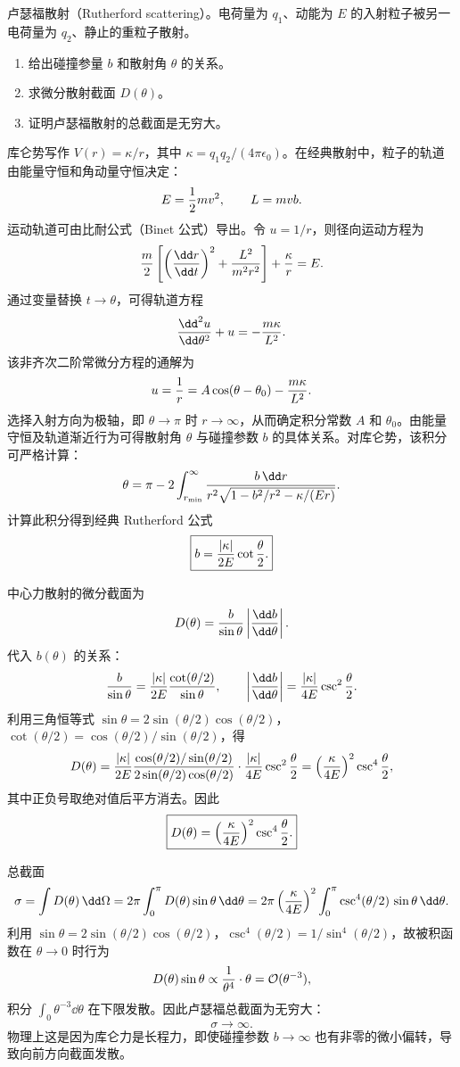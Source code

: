 \begin{question}
卢瑟福散射（Rutherford scattering）。电荷量为 $q_1$、动能为 $E$ 的入射粒子被另一电荷量为 $q_2$、静止的重粒子散射。
\begin{enumerate}
\item 给出碰撞参量 $b$ 和散射角 $\theta$ 的关系。
\item 求微分散射截面 $D(\theta)$。
\item 证明卢瑟福散射的总截面是无穷大。
\end{enumerate}
\end{question}
\begin{solution}
库仑势写作 $V(r)=\kappa/r$，其中 $\kappa=q_1q_2/(4\pi\epsilon_0)$。在经典散射中，粒子的轨道由能量守恒和角动量守恒决定：
\[
E={1\over2}mv^2,\qquad L=mvb.
\]
运动轨道可由比耐公式（Binet 公式）导出。令 $u=1/r$，则径向运动方程为
\[
{m\over2}\left[\left({\dd r\over\dd t}\right)^2+{L^2\over m^2r^2}\right]+{\kappa\over r}=E.
\]
通过变量替换 $t\to\theta$，可得轨道方程
\[
{\dd^2 u\over\dd\theta^2}+u=-{m\kappa\over L^2}.
\]
该非齐次二阶常微分方程的通解为
\[
u={1\over r}=A\cos(\theta-\theta_0)-{m\kappa\over L^2}.
\]
选择入射方向为极轴，即 $\theta\to\pi$ 时 $r\to\infty$，从而确定积分常数 $A$ 和 $\theta_0$。由能量守恒及轨道渐近行为可得散射角 $\theta$ 与碰撞参数 $b$ 的具体关系。对库仑势，该积分可严格计算：
\[
\theta=\pi-2\int_{r_{\min}}^{\infty}{b\,\dd r\over r^2\sqrt{1-b^2/r^2-\kappa/(Er)}}.
\]
计算此积分得到经典 Rutherford 公式
\[
\boxed{b={|\kappa|\over2E}\cot{\theta\over2}.}
\]

中心力散射的微分截面为
\[
D(\theta)={b\over\sin\theta}\left|{\dd b\over\dd\theta}\right|.
\]
代入 $b(\theta)$ 的关系：
\[
{b\over\sin\theta}={|\kappa|\over2E}{\cot(\theta/2)\over\sin\theta},
\qquad
\left|{\dd b\over\dd\theta}\right|={|\kappa|\over4E}\csc^2{\theta\over2}.
\]
利用三角恒等式 $\sin\theta=2\sin(\theta/2)\cos(\theta/2)$，$\cot(\theta/2)=\cos(\theta/2)/\sin(\theta/2)$，得
\[
D(\theta)={|\kappa|\over2E}{\cos(\theta/2)/\sin(\theta/2)\over2\sin(\theta/2)\cos(\theta/2)}\cdot{|\kappa|\over4E}\csc^2{\theta\over2}
=\left({\kappa\over4E}\right)^2\csc^4{\theta\over2},
\]
其中正负号取绝对值后平方消去。因此
\[
\boxed{D(\theta)=\left({\kappa\over4E}\right)^2\csc^4{\theta\over2}.}
\]

总截面
\[
\sigma=\int D(\theta)\,\dd\Omega=2\pi\int_0^\pi D(\theta)\sin\theta\,\dd\theta
=2\pi\left({\kappa\over4E}\right)^2\int_0^\pi{\csc^4(\theta/2)\,\sin\theta}\,\dd\theta.
\]
利用 $\sin\theta=2\sin(\theta/2)\cos(\theta/2)$，$\csc^4(\theta/2)=1/\sin^4(\theta/2)$，故被积函数在 $\theta\to0$ 时行为
\[
D(\theta)\sin\theta\propto{1\over\theta^4}\cdot\theta={\cal O}(\theta^{-3}),
\]
积分 $\int_0\theta^{-3}\dd\theta$ 在下限发散。因此卢瑟福总截面为无穷大：
\[
\boxed{\sigma\to\infty.}
\]
物理上这是因为库仑力是长程力，即使碰撞参数 $b\to\infty$ 也有非零的微小偏转，导致向前方向截面发散。
\end{solution}


